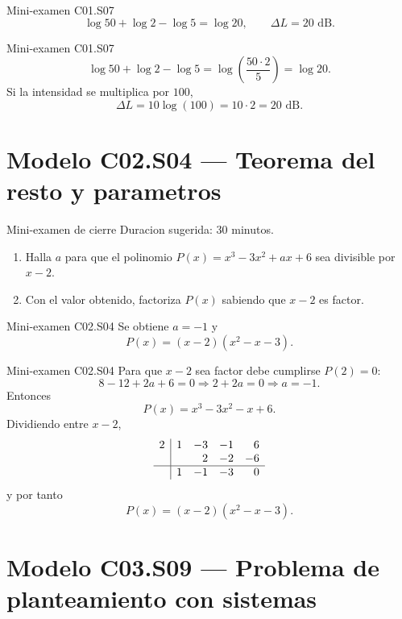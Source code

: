 \begin{shortanswer}{Mini-examen C01.S07}
\[
\log 50+\log 2-\log 5=\log 20,
\qquad
\Delta L=20\text{ dB}.
\]
\end{shortanswer}

\begin{fullsolution}{Mini-examen C01.S07}
\[
\log 50+\log 2-\log 5=\log\left(\frac{50\cdot 2}{5}\right)=\log 20.
\]
Si la intensidad se multiplica por \(100\),
\[
\Delta L=10\log(100)=10\cdot 2=20\text{ dB}.
\]
\end{fullsolution}

\section{Modelo C02.S04 --- Teorema del resto y parametros}

\begin{exambrief}{Mini-examen de cierre}
Duracion sugerida: \(30\) minutos.
\begin{enumerate}
  \item Halla \(a\) para que el polinomio \(P(x)=x^3-3x^2+ax+6\) sea divisible por \(x-2\).
  \item Con el valor obtenido, factoriza \(P(x)\) sabiendo que \(x-2\) es factor.
\end{enumerate}
\end{exambrief}

\begin{shortanswer}{Mini-examen C02.S04}
Se obtiene \(a=-1\) y
\[
P(x)=(x-2)(x^2-x-3).
\]
\end{shortanswer}

\begin{fullsolution}{Mini-examen C02.S04}
Para que \(x-2\) sea factor debe cumplirse \(P(2)=0\):
\[
8-12+2a+6=0
\Longrightarrow
2+2a=0
\Longrightarrow
a=-1.
\]
Entonces
\[
P(x)=x^3-3x^2-x+6.
\]
Dividiendo entre \(x-2\),
\[
\begin{array}{r|rrrr}
2 & 1 & -3 & -1 & 6\\
  &   & 2 & -2 & -6\\
\hline
  & 1 & -1 & -3 & 0
\end{array}
\]
y por tanto
\[
P(x)=(x-2)(x^2-x-3).
\]
\end{fullsolution}

\section{Modelo C03.S09 --- Problema de planteamiento con sistemas}

